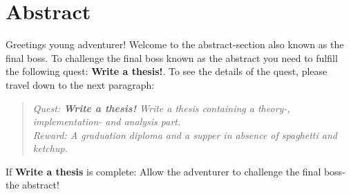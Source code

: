 \documentclass[../main.tex]{subfiles}
\begin{document}
\chapter{Abstract}
Greetings young adventurer! Welcome to the abstract-section also known as the final boss. To challenge the final boss known as the abstract you need to fulfill the following quest: \textbf{Write a thesis!}. To see the details of the quest, please travel down to the next paragraph:

\begin{quote}
    \textit{Quest: \textbf{Write a thesis!} Write a thesis containing a theory-, implementation- and analysis part.}\\
    
    \textit{Reward: A graduation diploma and a supper in absence of spaghetti and ketchup.}
\end{quote}

If \textbf{Write a thesis} is complete:
Allow the adventurer to challenge the final boss- the abstract!
\end{document}
